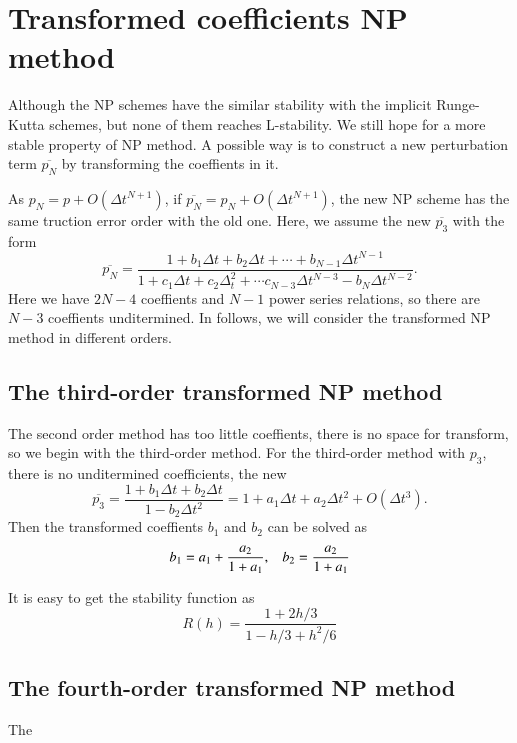 \documentclass[review]{elsarticle}
\theoremstyle{plain}\newtheorem{definition}{\sc{Definition}}
\theoremstyle{defination}\newtheorem{example}{Example}[section]
\numberwithin{equation}{section}
\numberwithin{table}{section}
\begin{document}
{\section{Transformed coefficients NP method}  
Although the NP schemes have  the similar stability with the implicit Runge-Kutta schemes, but none of them reaches L-stability. We still hope for a more stable property of NP method.     
A possible way is  to construct a new perturbation term $\overline{p_N}$ by  transforming  the coeffients in it.

As $p_N = p + O(\Delta t^{N+1})$, if $\overline{p_N}= p_N + O(\Delta t^{N+1})$, the new NP scheme has the same truction error order with the old one. Here, we  assume the new $\overline{p_3}$ with the form
\begin{equation}
  \overline{p_N} = \frac{ 1+ b_1 \Delta t+  b_2\Delta t +\cdots +b_{N-1}\Delta t^{N-1}}{1+c_1\Delta t +c_2\Delta_t^2 +\cdots c_{N-3}\Delta t^{N-3}-b_N \Delta t^{N-2}}.
  \end{equation}
  Here we have $2N-4$  coeffients and $N-1$  power series relations, so there are $N-3$ coeffients unditermined. In follows, we will consider the  transformed  NP method in different orders.    

  \subsection{ The third-order transformed NP method}
The second order method  has too little coeffients, there is no space for transform, so we begin with the third-order method. For the third-order method with $p_3$, there is no  unditermined coefficients,  the new 
\begin{equation}
\overline{p_3} =
 \frac{ 1+ b_1 \Delta t+ b_2\Delta t}{1-b_2 \Delta t^2}= 1+a_1\Delta t +a_2 \Delta t^2 + O(\Delta t^3).
\end{equation}
Then the transformed coeffients $b_1$ and $b_2$ can be solved as
\begin{equation}
  b_1= a_1+ \frac{a_2}{1+a_1},\hspace{0.3cm}  b_2=\frac{a_2}{1+a_1}
\end{equation}

It is easy to get the stability function as 
\begin{equation}
  R(h) = \frac{1+2h/3}{1-h/3+h^2/6}
\end{equation}

\subsection{The fourth-order transformed NP method}
The 






}
\end{document}
